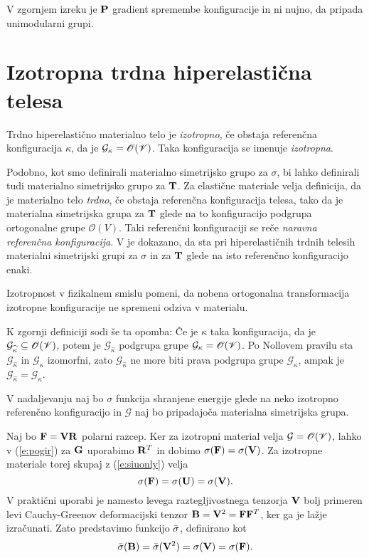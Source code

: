 V zgornjem izreku je $\mathbf P$ gradient spremembe konfiguracije in ni nujno,
da pripada unimodularni grupi.


\section{Izotropna trdna hiperelastična telesa}


\begin{definicija}
	Trdno hiperelastično materialno telo je \emph{izotropno}, če obstaja referenčna
	konfiguracija $\kappa$, da je $\mathcal{G}_{\kappa}=\mathscr{O}(\mathscr V)$. Taka konfiguracija
	se imenuje \emph{izotropna}.
\end{definicija}

\begin{opomba}
Podobno, kot smo definirali materialno simetrijsko grupo za $\sigma$, bi lahko
definirali tudi materialno simetrijsko grupo za $\mathbf T$. Za elastične
materiale velja definicija, da je materialno telo \emph{trdno}, če obstaja
referenčna konfiguracija telesa, tako da je materialna simetrijska grupa za $\mathbf T$
glede na to konfiguracijo podgrupa ortogonalne grupe $\mathscr{O}(V)$.
Taki referenčni konfiguraciji se reče \emph{naravna referenčna konfiguracija}. V \cite[str.~310]{truesdell} je dokazano,
da sta pri hiperelastičnih trdnih telesih materialni simetrijski grupi za $\sigma$ in za $\mathbf T$
glede na isto referenčno konfiguracijo enaki.
\end{opomba}

Izotropnost v fizikalnem smislu pomeni, da nobena ortogonalna transformacija izotropne
konfiguracije ne spremeni odziva v materialu.

K zgornji definiciji sodi še ta opomba: Če je $\widehat{\kappa}$ taka konfiguracija, da je
$\mathcal{G}_{\widehat{\kappa}}\subseteq\mathscr{O}(\mathscr V)$, potem je $\mathcal{G}_{\widehat{\kappa}}$
podgrupa grupe $\mathcal{G}_{\kappa}=\mathscr{O}(\mathscr V)$. Po Nollovem pravilu sta
$\mathcal{G}_{\widehat{\kappa}}$ in $\mathcal{G}_{\kappa}$ izomorfni, zato $\mathcal{G}_{\widehat{\kappa}}$
ne more biti prava podgrupa grupe $\mathcal{G}_{\kappa}$, ampak je
$\mathcal{G}_{\widehat{\kappa}}=\mathcal{G}_{\kappa}$.

V nadaljevanju naj bo $\sigma$ funkcija shranjene energije glede na neko izotropno referenčno konfiguracijo
in $\mathcal{G}$ naj bo pripadajoča materialna simetrijska grupa.

Naj bo $\mathbf F=\mathbf V\mathbf R$ polarni razcep. Ker za izotropni material velja $\mathcal{G}=\mathscr{O}(\mathscr V)$,
lahko v (\ref{e:pogir}) za $\mathbf G$ uporabimo $\mathbf R^T$ in dobimo $\sigma(\mathbf F)=\sigma(\mathbf V)$.
Za izotropne materiale torej skupaj z (\ref{e:siuonly}) velja
\[
	\sigma(\mathbf F)=\sigma(\mathbf U)=\sigma(\mathbf V).
\]
V praktični uporabi je namesto levega raztegljivostnega tenzorja $\mathbf V$ bolj primeren
levi Cauchy-Greenov deformacijski tenzor $\mathbf B=\mathbf V^2=\mathbf F\mathbf F^T$, ker
ga je lažje izračunati. Zato predstavimo funkcijo $\bar{\sigma}$, definirano kot
\begin{equation*} %
	\bar{\sigma}(\ten{B})=\bar{\sigma}(\ten{V}^2)=\sigma(\ten{V})=\sigma(\ten{F}).
\end{equation*}

